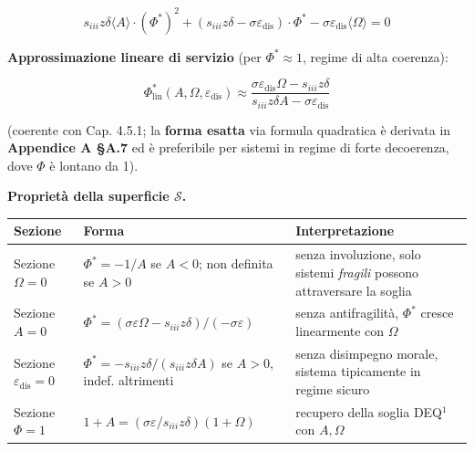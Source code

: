 \[
s_{iii} z \delta \langle A\rangle \cdot (\Phi^*)^2 + (s_{iii} z \delta - \sigma \varepsilon_{\text{dis}}) \cdot \Phi^* - \sigma \varepsilon_{\text{dis}} \langle\Omega\rangle = 0
\]

\Hypoth{} \textbf{Approssimazione lineare di servizio} (per
\(\Phi^* \approx 1\), regime di alta coerenza):

\[
\Phi^*_{\text{lin}}(A, \Omega, \varepsilon_{\text{dis}}) \approx \frac{\sigma \varepsilon_{\text{dis}} \Omega - s_{iii} z \delta}{s_{iii} z \delta A - \sigma \varepsilon_{\text{dis}}}
\]

(coerente con Cap. 4.5.1; la \textbf{forma esatta} via formula
quadratica è derivata in \textbf{Appendice A \S{}A.7} ed è preferibile per
sistemi in regime di forte decoerenza, dove \(\Phi\) è lontano da 1).

\Proved{} \textbf{Proprietà della superficie \(\mathcal{S}\).}

{\def\LTcaptype{none} %
{\small\begin{longtable}[]{@{}
  >{\raggedright\arraybackslash}p{}
  >{\raggedright\arraybackslash}p{}
  >{\raggedright\arraybackslash}p{}@{}}
\toprule\noalign{}
\begin{minipage}[b]{\linewidth}\raggedright
Sezione
\end{minipage} & \begin{minipage}[b]{\linewidth}\raggedright
Forma
\end{minipage} & \begin{minipage}[b]{\linewidth}\raggedright
Interpretazione
\end{minipage} \\
\midrule\noalign{}
\endhead
\bottomrule\noalign{}
\endlastfoot
Sezione \(\Omega = 0\) & \(\Phi^* = -1/A\) se \(A < 0\); non definita se
\(A > 0\) & senza involuzione, solo sistemi \emph{fragili} possono
attraversare la soglia \\
Sezione \(A = 0\) &
\(\Phi^* = (\sigma\varepsilon\Omega - s_{iii}z\delta) / (-\sigma\varepsilon)\)
& senza antifragilità, \(\Phi^*\) cresce linearmente con \(\Omega\) \\
Sezione \(\varepsilon_{\text{dis}} = 0\) &
\(\Phi^* = -s_{iii}z\delta / (s_{iii}z\delta A)\) se \(A > 0\), indef.
altrimenti & senza disimpegno morale, sistema tipicamente in regime
sicuro \\
Sezione \(\Phi = 1\) &
\(1 + A = (\sigma\varepsilon/s_{iii}z\delta)(1 + \Omega)\) & recupero
della soglia DEQ$^1$ con \(A, \Omega\) \\
\end{longtable}}
}

